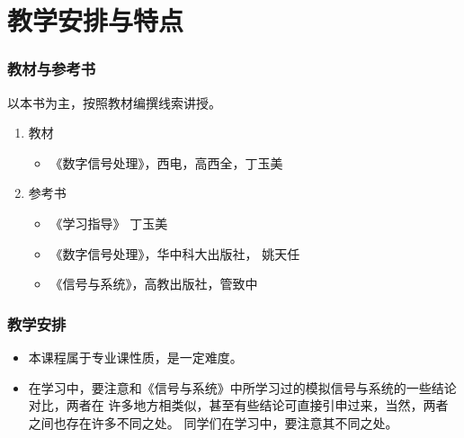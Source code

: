 \documentclass[notheorems,compress,mathserif,table]{beamer}
\begin{document}
\section{教学安排与特点}
\begin{frame}[shrink]\frametitle{教材与参考书}%
以本书为主，按照教材编撰线索讲授。
\begin{enumerate}
  \item 教材
        \begin{itemize}
          \item 《数字信号处理》，西电，高西全，丁玉美
        \end{itemize}
  \item 参考书
          \begin{itemize}
            \item 《学习指导》      丁玉美
            \item 《数字信号处理》，华中科大出版社，  姚天任
            \item 《信号与系统》，高教出版社，管致中
          \end{itemize}
\end{enumerate}
\end{frame}
%
%
%
%
%
%
\begin{frame}[shrink]\frametitle{教学安排}%


\begin{itemize}
  \item
      本课程属于专业课性质，是一定难度。
  \item
      在学习中，要注意和《信号与系统》中所学习过的模拟信号与系统的一些结论对比，两者在
      许多地方相类似，甚至有些结论可直接引申过来，当然，两者之间也存在许多不同之处。
      同学们在学习中，要注意其不同之处。
\end{itemize}

\end{frame}
%
\end{document}
